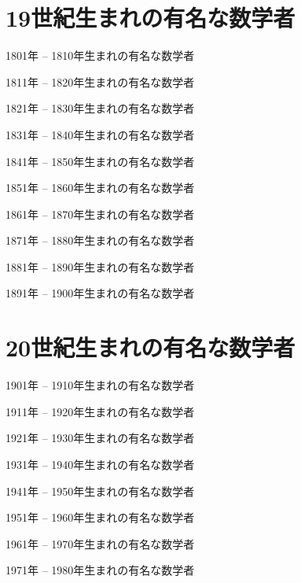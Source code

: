 \documentclass[a4paper,12pt,dvipdfmx]{jsarticle}
\theoremstyle{plain}
\theoremstyle{remark}  %
\theoremstyle{definition}  %
\begin{document}
\section{19世紀生まれの有名な数学者}
1801年 -- 1810年生まれの有名な数学者

1811年 -- 1820年生まれの有名な数学者

1821年 -- 1830年生まれの有名な数学者

1831年 -- 1840年生まれの有名な数学者

1841年 -- 1850年生まれの有名な数学者

1851年 -- 1860年生まれの有名な数学者

1861年 -- 1870年生まれの有名な数学者

1871年 -- 1880年生まれの有名な数学者

1881年 -- 1890年生まれの有名な数学者

1891年 -- 1900年生まれの有名な数学者

\section{20世紀生まれの有名な数学者}
1901年 -- 1910年生まれの有名な数学者

1911年 -- 1920年生まれの有名な数学者

1921年 -- 1930年生まれの有名な数学者

1931年 -- 1940年生まれの有名な数学者

1941年 -- 1950年生まれの有名な数学者

1951年 -- 1960年生まれの有名な数学者

1961年 -- 1970年生まれの有名な数学者

1971年 -- 1980年生まれの有名な数学者




\end{document}

